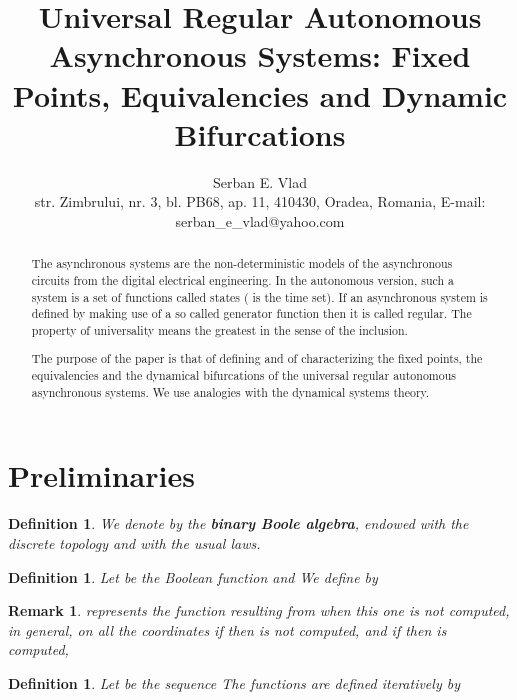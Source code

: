 \documentclass[12pt]{article}\usepackage{amsmath}
\newtheorem{definition}[theorem]{Definition}
\newtheorem{remark}[theorem]{Remark}
\begin{document}
\title{Universal Regular Autonomous Asynchronous Systems: Fixed Points, Equivalencies
and Dynamic Bifurcations}
\author{Serban E. Vlad\\str. Zimbrului, nr. 3, bl. PB68, ap. 11, 410430, Oradea, Romania, E-mail: serban\_e\_vlad@yahoo.com}
\maketitle

\begin{abstract}
The asynchronous systems are the non-deterministic models of the asynchronous
circuits from the digital electrical engineering. In the autonomous version,
such a system is a set of functions 
called states ( is the time set). If an asynchronous system is
defined by making use of a so called generator function  then it is called regular. The property of
universality means the greatest in the sense of the inclusion.

The purpose of the paper is that of defining and of characterizing the fixed
points, the equivalencies and the dynamical bifurcations of the universal
regular autonomous asynchronous systems. We use analogies with the dynamical
systems theory.

\end{abstract}

\section{Preliminaries}

\begin{definition}
We denote by  the \textbf{binary Boole algebra}, endowed
with the discrete topology and with the usual laws.
\end{definition}

\begin{definition}
Let be the Boolean function  and  We define 
by 

\end{definition}

\begin{remark}
 represents the function resulting from  when this one is
not computed, in general, on all the coordinates 
if  then  is not computed, 
and if  then  is computed, 
\end{remark}

\begin{definition}
Let be the sequence  The functions  are defined iteratively by 

\end{definition}
\end{document}
